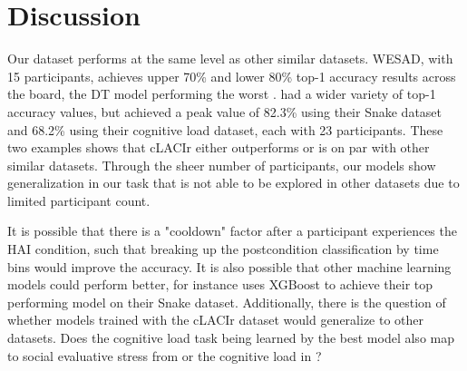 \documentclass[12pt]{iopart}
\begin{document}
%


\section*{Discussion}

Our dataset performs at the same level as other similar datasets.  WESAD, with 15 participants, achieves upper 70\% and lower 80\% top-1 accuracy results across the board, the DT model performing the worst \cite{schmidt2018introducing}.  \cite{gjoreski2020datasets} had a wider variety of top-1 accuracy values, but achieved a peak value of 82.3\% using their Snake dataset and 68.2\% using their cognitive load dataset, each with 23 participants.  These two examples shows that cLACIr either outperforms or is on par with other similar datasets.  Through the sheer number of participants, our models show generalization in our task that is not able to be explored in other datasets due to limited participant count.  

It is possible that there is a "cooldown" factor after a participant experiences the HAI condition, such that breaking up the postcondition classification by time bins would improve the accuracy.  It is also possible that other machine learning models could perform better, for instance \cite{gjoreski2020datasets} uses XGBoost to achieve their top performing model on their Snake dataset.  Additionally, there is the question of whether models trained with the cLACIr dataset would generalize to other datasets.  Does the cognitive load task being learned by the best model also map to social evaluative stress from \cite{schmidt2018introducing} or the cognitive load in \cite{gjoreski2020datasets}?
\end{document}
